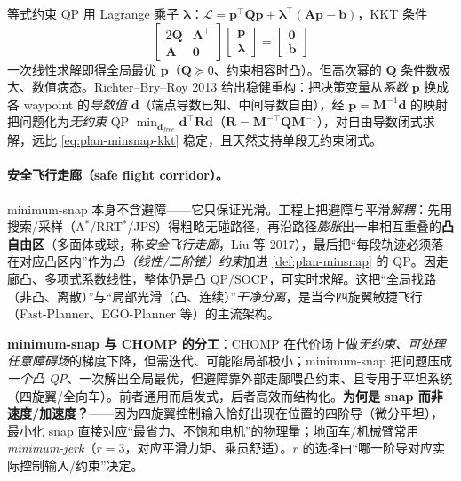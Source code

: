 \begin{derivation}\label{der:plan-minsnap}
等式约束 QP 用 Lagrange 乘子 $\boldsymbol\lambda$：$\mathcal{L}=\mathbf{p}^\top\mathbf{Q}\mathbf{p}+\boldsymbol\lambda^\top(\mathbf{A}\mathbf{p}-\mathbf{b})$，KKT 条件
\begin{equation}
  \begin{bmatrix}2\mathbf{Q}&\mathbf{A}^\top\\\mathbf{A}&\mathbf{0}\end{bmatrix}
  \begin{bmatrix}\mathbf{p}\\\boldsymbol\lambda\end{bmatrix}
  =\begin{bmatrix}\mathbf{0}\\\mathbf{b}\end{bmatrix}
  \label{eq:plan-minsnap-kkt}
\end{equation}
一次线性求解即得全局最优 $\mathbf{p}$（$\mathbf{Q}\succeq0$、约束相容时凸）。但高次幂的 $\mathbf{Q}$ 条件数极大、数值病态。Richter--Bry--Roy 2013\cite{richter2016polynomial} 给出稳健重构：把决策变量从\emph{系数} $\mathbf{p}$ 换成各 waypoint 的\emph{导数值} $\mathbf{d}$（端点导数已知、中间导数自由），经 $\mathbf{p}=\mathbf{M}^{-1}\mathbf{d}$ 的映射把问题化为\emph{无约束} QP $\min_{\mathbf{d}_{free}}\mathbf{d}^\top\mathbf{R}\mathbf{d}$（$\mathbf{R}=\mathbf{M}^{-\top}\mathbf{Q}\mathbf{M}^{-1}$），对自由导数闭式求解，远比 \cref{eq:plan-minsnap-kkt} 稳定，且天然支持单段无约束闭式。
\end{derivation}

\paragraph{安全飞行走廊（safe flight corridor）。}
minimum-snap 本身不含避障——它只保证光滑。工程上把避障与平滑\emph{解耦}：先用搜索/采样（A$^*$/RRT$^*$/JPS）得粗略无碰路径，再沿路径\emph{膨胀}出一串相互重叠的\textbf{凸自由区}（多面体或球，称\emph{安全飞行走廊}，Liu 等 2017\cite{liu2017corridor}），最后把“每段轨迹必须落在对应凸区内”作为\emph{凸（线性/二阶锥）约束}加进 \cref{def:plan-minsnap} 的 QP。因走廊凸、多项式系数线性，整体仍是凸 QP/SOCP，可实时求解。这把“全局找路（非凸、离散）”与“局部光滑（凸、连续）”\emph{干净分离}，是当今四旋翼敏捷飞行（Fast-Planner、EGO-Planner 等）的主流架构。

\begin{insight}
\textbf{minimum-snap 与 CHOMP 的分工}：CHOMP 在代价场上做\emph{无约束、可处理任意障碍场}的梯度下降，但需迭代、可能陷局部极小；minimum-snap 把问题压成\emph{一个凸 QP}、一次解出全局最优，但避障靠外部走廊喂凸约束、且专用于平坦系统（四旋翼/全向车）。前者通用而启发式，后者高效而结构化。\textbf{为何是 snap 而非速度/加速度？}——因为四旋翼控制输入恰好出现在位置的四阶导（微分平坦），最小化 snap 直接对应“最省力、不饱和电机”的物理量；地面车/机械臂常用 \emph{minimum-jerk}（$r=3$，对应平滑力矩、乘员舒适）。$r$ 的选择由“哪一阶导对应实际控制输入/约束”决定。
\end{insight}

